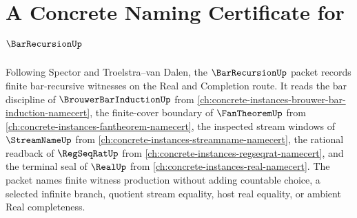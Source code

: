 \chapter{A Concrete Naming Certificate for $\BarRecursionUp$}
\label{ch:concrete-instances-bar-recursion-namecert}

Following Spector and Troelstra--van Dalen, the $\BarRecursionUp$ packet records finite bar-recursive witnesses on the Real and Completion route. It reads the bar discipline of $\BrouwerBarInductionUp$ from \autoref{ch:concrete-instances-brouwer-bar-induction-namecert}, the finite-cover boundary of $\FanTheoremUp$ from \autoref{ch:concrete-instances-fantheorem-namecert}, the inspected stream windows of $\StreamNameUp$ from \autoref{ch:concrete-instances-streamname-namecert}, the rational readback of $\RegSeqRatUp$ from \autoref{ch:concrete-instances-regseqrat-namecert}, and the terminal seal of $\RealUp$ from \autoref{ch:concrete-instances-real-namecert}. The packet names finite witness production without adding countable choice, a selected infinite branch, quotient stream equality, host real equality, or ambient Real completeness.

